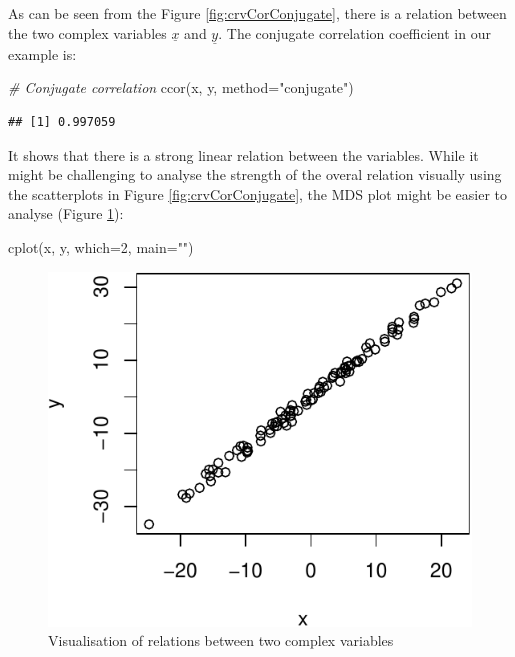 \documentclass[
]{book}
\newenvironment{Shaded}{\begin{snugshade}}{\end{snugshade}}
\newcommand{\AttributeTok}[1]{\textcolor[rgb]{0.77,0.63,0.00}{#1}}
\newcommand{\CommentTok}[1]{\textcolor[rgb]{0.56,0.35,0.01}{\textit{#1}}}
\newcommand{\DecValTok}[1]{\textcolor[rgb]{0.00,0.00,0.81}{#1}}
\newcommand{\FunctionTok}[1]{\textcolor[rgb]{0.00,0.00,0.00}{#1}}
\newcommand{\NormalTok}[1]{#1}
\newcommand{\StringTok}[1]{\textcolor[rgb]{0.31,0.60,0.02}{#1}}
\begin{document}
As can be seen from the Figure \ref{fig:crvCorConjugate}, there is a relation between the two complex variables \(\underline{x}\) and \(\underline{y}\). The conjugate correlation coefficient in our example is:

\begin{Shaded}
\begin{Highlighting}[]
\CommentTok{\# Conjugate correlation}
\FunctionTok{ccor}\NormalTok{(x, y, }\AttributeTok{method=}\StringTok{"conjugate"}\NormalTok{)}
\end{Highlighting}
\end{Shaded}

\begin{verbatim}
## [1] 0.997059
\end{verbatim}

It shows that there is a strong linear relation between the variables. While it might be challenging to analyse the strength of the overal relation visually using the scatterplots in Figure \ref{fig:crvCorConjugate}, the MDS plot might be easier to analyse (Figure \ref{fig:crvCorConjugateMDS}):

\begin{Shaded}
\begin{Highlighting}[]
\FunctionTok{cplot}\NormalTok{(x, y, }\AttributeTok{which=}\DecValTok{2}\NormalTok{, }\AttributeTok{main=}\StringTok{""}\NormalTok{)}
\end{Highlighting}
\end{Shaded}

\begin{figure}
\centering
\includegraphics{Svetunkov---Svetunkov---Complex-Valued-Econometrics_files/figure-latex/crvCorConjugateMDS-1.pdf}
\caption{\label{fig:crvCorConjugateMDS}Visualisation of relations between two complex variables}
\end{figure}
\end{document}
